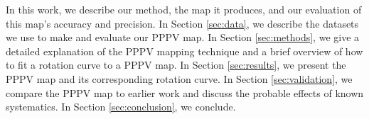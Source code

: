 In this work, we describe our method, the map it produces, and our evaluation of this map's accuracy and precision.
In Section \ref{sec:data}, we describe the datasets we use to make and evaluate our PPPV map.
In Section \ref{sec:methods}, we give a detailed explanation of the PPPV mapping technique and a brief overview of how to fit a rotation curve to a PPPV map.
In Section \ref{sec:results}, we present the PPPV map and its corresponding rotation curve.
In Section \ref{sec:validation}, we compare the PPPV map to earlier work and discuss the probable effects of known systematics.
In Section \ref{sec:conclusion}, we conclude.